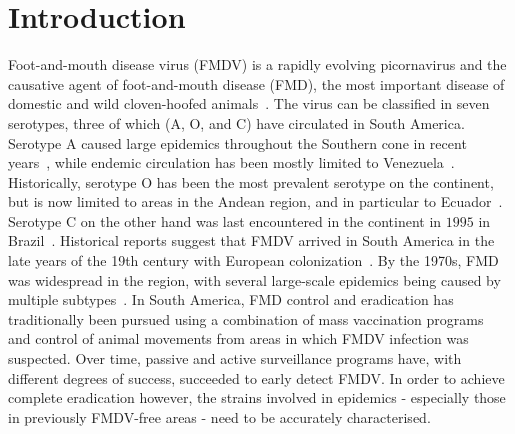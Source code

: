 \documentclass[10pt]{article}
\begin{document}
\section*{Introduction}

Foot-and-mouth disease virus (FMDV) is a rapidly evolving picornavirus and the causative agent of foot-and-mouth disease (FMD), the most important disease of domestic and wild cloven-hoofed animals~\cite{review}.
The virus can be classified in seven serotypes, three of which (A, O, and C) have circulated in South America.
Serotype A caused large epidemics throughout the Southern cone in recent years~\cite{Perez2001, Malirat2012}, while endemic circulation has been mostly limited to Venezuela~\cite{Malirat2012}.
Historically, serotype O has been the most prevalent serotype on the continent, but is now limited to areas in the Andean region, and in particular to Ecuador~\cite{andean}.
Serotype C on the other hand was last encountered in the continent in $1995$ in Brazil~\cite{review_eradication}.
Historical reports suggest that FMDV arrived in South America in the late years of the 19th century with European colonization~\cite{Naranjo2013, tully}. 
By the 1970s, FMD was widespread in the region, with several large-scale epidemics being caused by multiple subtypes~\cite{Saraiva2003}.
In South America, FMD control and eradication has traditionally been pursued using a combination of mass vaccination programs~\cite{vaccinationSA} and control of animal movements from areas in which FMDV infection was suspected.
Over time, passive and active surveillance programs have, with different degrees of success, succeeded to early detect FMDV.
In order to achieve complete eradication however, the strains involved in epidemics - especially those in previously FMDV-free areas - need to be accurately characterised.
\end{document}
